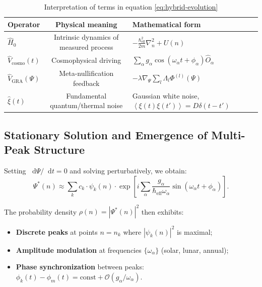\documentclass[12pt,a4paper]{article}
\theoremstyle{plain}
\theoremstyle{definition}
\theoremstyle{remark}
\newcommand{\GRA}{\text{GRA}}
\newcommand{\eff}{\text{eff}}
\newcommand{\cosmo}{\text{cosmo}}
\newcommand{\abs}[1]{\left|#1\right|}
\newcommand{\expect}[1]{\left\langle #1 \right\rangle}
\newcommand{\diff}{\mathop{}\!\mathrm{d}}
\begin{document}
\begin{table}[H]
\centering
\caption{Interpretation of terms in equation \eqref{eq:hybrid-evolution}}
\label{tab:operator-dictionary}
\renewcommand{\arraystretch}{1.4}
\begin{tabular}{@{}lcp{8cm}@{}}
\toprule
\textbf{Operator} & \textbf{Physical meaning} & \textbf{Mathematical form} \\
\midrule
$\hat{H}_0$ & Intrinsic dynamics of measured process & $-\frac{\hbar_{\eff}^2}{2m}\nabla_n^2 + U(n)$ \\
\addlinespace
$\hat{V}_{\cosmo}(t)$ & Cosmophysical driving & $\sum_{\alpha} g_{\alpha} \cos(\omega_{\alpha} t + \phi_{\alpha}) \hat{O}_{\alpha}$ \\
\addlinespace
$\hat{V}_{\GRA}(\Psi)$ & Meta-nullification feedback & $-\lambda \nabla_{\Psi} \sum_l \Lambda_l \Phi^{(l)}(\Psi)$ \\
\addlinespace
$\hat{\xi}(t)$ & Fundamental quantum/thermal noise & Gaussian white noise, $\expect{\xi(t)\xi(t')} = D\delta(t-t')$ \\
\bottomrule
\end{tabular}
\end{table}

\subsection{Stationary Solution and Emergence of Multi-Peak Structure}

Setting $\diff\Psi/\diff t = 0$ and solving perturbatively, we obtain:
\begin{equation}
\Psi^*(n) \approx \sum_k c_k \cdot \psi_k(n) \cdot 
\exp\left[i \sum_{\alpha} \frac{g_{\alpha}}{\hbar_{\eff}\omega_{\alpha}} \sin(\omega_{\alpha} t + \phi_{\alpha})\right].
\label{eq:stationary-solution}
\end{equation}

The probability density $\rho(n) = \abs{\Psi^*(n)}^2$ then exhibits:
\begin{itemize}
    \item \textbf{Discrete peaks} at points $n = n_k$ where $\abs{\psi_k(n)}^2$ is maximal;
    \item \textbf{Amplitude modulation} at frequencies $\{\omega_{\alpha}\}$ (solar, lunar, annual);
    \item \textbf{Phase synchronization} between peaks: $\phi_k(t) - \phi_m(t) = \text{const} + \mathcal{O}(g_{\alpha}/\omega_{\alpha})$.
\end{itemize}
\end{document}
